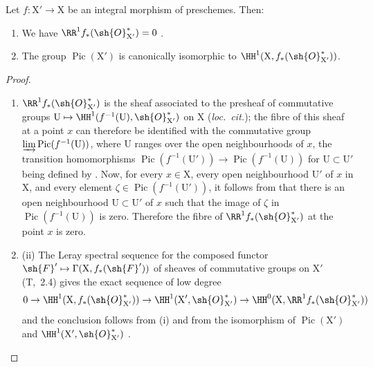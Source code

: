 \begin{corollary}[21.8.2]
\label{IV.21.8.2}
Let $f:\mathrm{X}'\to\mathrm{X}$ be an integral morphism of preschemes.
Then:
\begin{enumerate}[label=(\roman*)]
  \item We have $\RR^1 f_*(\sh{O}^*_{\mathrm{X}'})=0$ .
  \item The group $\operatorname{Pic}(\mathrm{X}')$ is canonically isomorphic to $\HH^1(\mathrm{X},f_*(\sh{O}^*_{\mathrm{X}'}))$.
\end{enumerate}
\end{corollary}

\begin{proof}
\begin{enumerate}[label=(\roman*)]
  \item $\RR^1f_*(\sh{O}^*_{\mathrm{X}'})$ is the sheaf associated to the presheaf of commutative groups $\mathrm{U}\mapsto\HH^1(f^{-1}(\mathrm{U}),\sh{O}^*_{\mathrm{X}'})$ on $\mathrm{X}$ (\emph{loc.\ cit.});
  the fibre of this sheaf at a point $x$ can therefore be identified  with the commutative group $\varinjlim\operatorname{Pic}(f^{-1}(\mathrm{U}))$, where $\mathrm{U}$ ranges over the open neighbourhoods of $x$, the transition homomorphisms $\operatorname{Pic}(f^{-1}(\mathrm{U}'))\to\operatorname{Pic}(f^{-1}(\mathrm{U}))$ for $\mathrm{U}\subset\mathrm{U}'$ being defined by .
Now, for every $x\in\mathrm{X}$, every open neighbourhood $\mathrm{U}'$ of $x$ in $\mathrm{X}$, and every element $\zeta\in\operatorname{Pic}(f^{-1}(\mathrm{U}'))$, it follows from  that there is an open neighbourhood $\mathrm{U}\subset\mathrm{U}'$ of $x$ such that the image of $\zeta$ in $\operatorname{Pic}(f^{-1}(\mathrm{U}))$ is zero.
Therefore the fibre of $\RR^1 f_*(\sh{O}^*_{\mathrm{X}'})$ at the point $x$ is zero.

  \item (ii) The Leray spectral sequence for the composed functor $\sh{F}'\mapsto\Gamma(\mathrm{X},f_*(\sh{F}'))$ of sheaves of commutative groups on $\mathrm{X}'$ (T,~2.4) gives the exact sequence of low degree
\[
  0\to\HH^1(\mathrm{X},f_*(\sh{O}^*_{\mathrm{X}'}))\to\HH^1(\mathrm{X}',\sh{O}^*_{\mathrm{X}'})\to\HH^0(\mathrm{X},\RR^1 f_*(\sh{O}^*_{\mathrm{X}'}))
\]
and the conclusion follows from (i) and from the isomorphism of $\operatorname{Pic}(\mathrm{X}')$ and $\HH^1(\mathrm{X}',\sh{O}^*_{\mathrm{X}'})$ .
\end{enumerate}
\end{proof}

